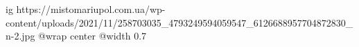  
 
 
 
 

\ifcmt
  ig https://mistomariupol.com.ua/wp-content/uploads/2021/11/258703035_4793249594059547_6126688957704872830_n-2.jpg
  @wrap center
  @width 0.7
\fi
